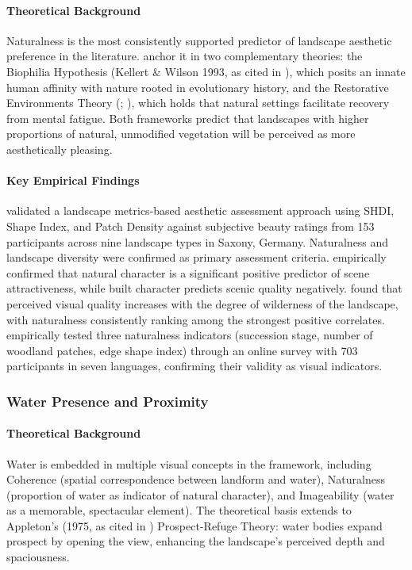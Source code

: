 \documentclass[hidelinks, 11pt]{article}
\begin{document}
\paragraph{Theoretical Background}
Naturalness is the most consistently supported predictor of landscape aesthetic preference in the literature. \citet{ode_capturing_2008} anchor it in two complementary theories: the Biophilia Hypothesis (Kellert \& Wilson 1993, as cited in \citet{tveit_key_2006}), which posits an innate human affinity with nature rooted in evolutionary history, and the Restorative Environments Theory (\citet{kaplan_experience_1989}; \citet{ulrich_visual_1979,ulrich_view_1984}), which holds that natural settings facilitate recovery from mental fatigue. Both frameworks predict that landscapes with higher proportions of natural, unmodified vegetation will be perceived as more aesthetically pleasing.

\paragraph{Key Empirical Findings}
\citet{frank_assessment_2013} validated a landscape metrics-based aesthetic assessment approach using SHDI, Shape Index, and Patch Density against subjective beauty ratings from 153 participants across nine landscape types in Saxony, Germany. Naturalness and landscape diversity were confirmed as primary assessment criteria. \citet{van_der_jagt_unearthing_2014} empirically confirmed that natural character is a significant positive predictor of scene attractiveness, while built character predicts scenic quality negatively. \citet{arriaza_assessing_2004} found that perceived visual quality increases with the degree of wilderness of the landscape, with naturalness consistently ranking among the strongest positive correlates. \citet{ode_analysing_2010} empirically tested three naturalness indicators (succession stage, number of woodland patches, edge shape index) through an online survey with 703 participants in seven languages, confirming their validity as visual indicators.

\subsubsection{Water Presence and Proximity}\label{sec:WP}
\paragraph{Theoretical Background}
Water is embedded in multiple visual concepts in the \citet{ode_capturing_2008} framework, including Coherence (spatial correspondence between landform and water), Naturalness (proportion of water as indicator of natural character), and Imageability (water as a memorable, spectacular element). The theoretical basis extends to Appleton's (1975, as cited in \citet{tveit_key_2006}) Prospect-Refuge Theory: water bodies expand prospect by opening the view, enhancing the landscape's perceived depth and spaciousness.
\end{document}
